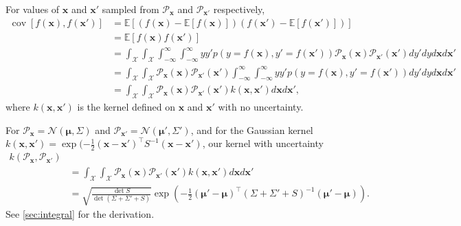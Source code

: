 \documentclass[oneside, 11pt]{article}
\DeclareMathOperator{\cov}{cov}
\begin{document}
For values of $\mathbf{x}$ and $\mathbf{x}'$ sampled from $\mathcal{P}_\mathbf{x}$ and $\mathcal{P}_{\mathbf{x}'}$ respectively,  \begin{align*}
    \cov\left[f(\mathbf{x}),f(\mathbf{x}')\right] &= \mathbb{E}\left[\left(f\left(\mathbf{x}\right) - \mathbb{E}\left[f\left(\mathbf{x}\right)\right]\right)\left(f\left(\mathbf{x}'\right) - \mathbb{E}\left[f\left(\mathbf{x}'\right)\right]\right)\right] \\
    &= \mathbb{E}\left[f\left(\mathbf{x}\right)f\left(\mathbf{x}'\right)\right] \\
    &= \int_{\mathcal{X}}\int_{\mathcal{X}}\int_{-\infty}^{\infty} \int_{-\infty}^{\infty} y y' p\left(y = f\left(\mathbf{x}\right), y' = f\left(\mathbf{x}'\right)\right) \mathcal{P}_{\mathbf{x}}(\mathbf{x}) \mathcal{P}_{\mathbf{x}'}(\mathbf{x}') dy'dyd\mathbf{x}d\mathbf{x}' \\
    &= \int_{\mathcal{X}}\int_{\mathcal{X}}\mathcal{P}_{\mathbf{x}}(\mathbf{x}) \mathcal{P}_{\mathbf{x}'}(\mathbf{x}')\int_{-\infty}^{\infty} \int_{-\infty}^{\infty} y y' p\left(y = f\left(\mathbf{x}\right), y' = f\left(\mathbf{x}'\right)\right)  dy'dyd\mathbf{x}d\mathbf{x}' \\
    &= \int_{\mathcal{X}}\int_{\mathcal{X}}\mathcal{P}_{\mathbf{x}}(\mathbf{x}) \mathcal{P}_{\mathbf{x}'}(\mathbf{x}')k(\mathbf{x}, \mathbf{x}')d\mathbf{x}d\mathbf{x}' \text{,}
\end{align*} where $k(\mathbf{x}, \mathbf{x}')$ is the kernel defined on $\mathbf{x}$ and $\mathbf{x}'$ with no uncertainty.

For $\mathcal{P}_\mathbf{x} = \mathcal{N}(\bm{\mu}, \Sigma)$ and $\mathcal{P}_{\mathbf{x}'} = \mathcal{N}(\bm{\mu}', \Sigma')$, and for the Gaussian kernel $k(\mathbf{x}, \mathbf{x}') = \exp(-\frac12(\mathbf{x} - \mathbf{x}')^\top S^{-1} (\mathbf{x} - \mathbf{x}')$, our kernel with uncertainty \begin{align*}
    k(\mathcal{P}_\mathbf{x}, \mathcal{P}_{\mathbf{x}'}) \\
    &= \int_{\mathcal{X}}\int_{\mathcal{X}}\mathcal{P}_{\mathbf{x}}(\mathbf{x}) \mathcal{P}_{\mathbf{x}'}(\mathbf{x}')k(\mathbf{x}, \mathbf{x}')d\mathbf{x}d\mathbf{x}' \\
    &= \sqrt{\frac{\det S}{\det\left(\Sigma + \Sigma' + S\right)}} \exp\left(-\frac{1}{2}\left(\bm{\mu}' - \bm{\mu}\right)^\top \left( \Sigma + \Sigma' + S\right)^{-1}\left(\bm{\mu}' - \bm{\mu}\right)\right) \text{.}
\end{align*} See \cref{sec:integral} for the derivation.
\end{document}

